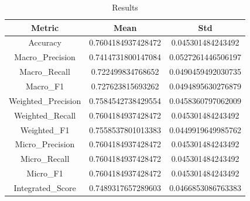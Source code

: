 \begin{table}[htbp]
\centering
\caption{Results}
\label{tab:csv}
\small
\setlength{\tabcolsep}{4pt}
\begin{tabular}{|c|c|c|}
\hline
Metric & Mean & Std \\
\hline
Accuracy & 0.7604184937428472 & 0.045301484243492 \\
Macro_Precision & 0.7414731800147084 & 0.0527261446506197 \\
Macro_Recall & 0.722499834768652 & 0.0490459492030735 \\
Macro_F1 & 0.727623815693262 & 0.0494895630276879 \\
Weighted_Precision & 0.7584542738429554 & 0.0458360797062009 \\
Weighted_Recall & 0.7604184937428472 & 0.045301484243492 \\
Weighted_F1 & 0.7558537801013383 & 0.0449919649985762 \\
Micro_Precision & 0.7604184937428472 & 0.045301484243492 \\
Micro_Recall & 0.7604184937428472 & 0.045301484243492 \\
Micro_F1 & 0.7604184937428472 & 0.045301484243492 \\
Integrated_Score & 0.7489317657289603 & 0.0466853086763383 \\
\hline
\end{tabular}
\end{table}